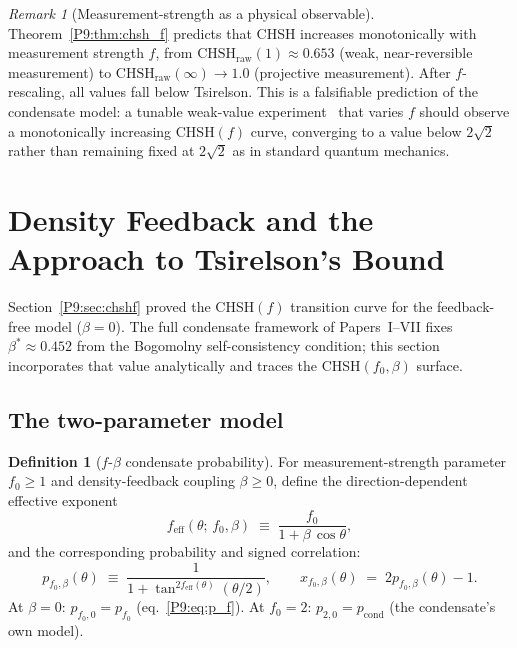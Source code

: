 \documentclass[11pt,a4paper]{article}
\theoremstyle{definition}
\newtheorem{definition}[theorem]{Definition}
\theoremstyle{remark}
\newtheorem{remark}[theorem]{Remark}
\newcommand{\pcond}{p_{\mathrm{cond}}}
\newcommand{\CHSH}{\mathrm{CHSH}}
\newcommand{\Tsirelson}{2\sqrt{2}}
\begin{document}
\begin{remark}[Measurement-strength as a physical observable]
\label{P9:rem:measurement_strength_observable}
Theorem~\ref{P9:thm:chsh_f} predicts that CHSH increases monotonically with
measurement strength $f$, from $\CHSH_\mathrm{raw}(1)\approx0.653$ (weak,
near-reversible measurement) to $\CHSH_\mathrm{raw}(\infty)\to1.0$
(projective measurement).
After $f$-rescaling, all values fall below Tsirelson.
This is a falsifiable prediction of the condensate model: a tunable
weak-value experiment~\cite{Paper8} that varies $f$ should observe
a monotonically increasing CHSH$(f)$ curve, converging to a value below
$\Tsirelson$ rather than remaining fixed at $\Tsirelson$ as in standard
quantum mechanics.
\end{remark}
 
\section{Density Feedback and the Approach to Tsirelson's Bound}
\label{P9:sec:feedback_extension}
 
Section~\ref{P9:sec:chshf} proved the CHSH$(f)$ transition curve for the
feedback-free model ($\beta=0$).
The full condensate framework of Papers~I--VII fixes $\beta^*\approx0.452$
from the Bogomolny self-consistency condition; this section
incorporates that value analytically and traces the CHSH$(f_0,\beta)$
surface.
 
\subsection{The two-parameter model}
 
\begin{definition}[$f$-$\beta$ condensate probability]
\label{P9:def:p_f_beta}
For measurement-strength parameter $f_0\geq1$ and density-feedback
coupling $\beta\geq0$, define the direction-dependent effective exponent
\begin{equation}
  f_\mathrm{eff}(\theta;\,f_0,\beta)
  \;\equiv\; \frac{f_0}{1 + \beta\,\cos\theta},
  \label{P9:eq:f_eff}
\end{equation}
and the corresponding probability and signed correlation:
\begin{equation}
  p_{f_0,\beta}(\theta)
  \;\equiv\; \frac{1}{1+\tan^{2f_\mathrm{eff}(\theta)}(\theta/2)},
  \qquad
  x_{f_0,\beta}(\theta) \;=\; 2p_{f_0,\beta}(\theta)-1.
  \label{P9:eq:p_fb}
\end{equation}
At $\beta=0$: $p_{f_0,0} = p_{f_0}$ (eq.~\eqref{P9:eq:p_f}).
At $f_0=2$: $p_{2,0} = \pcond$ (the condensate's own model).
\end{definition}
 
\end{document}
